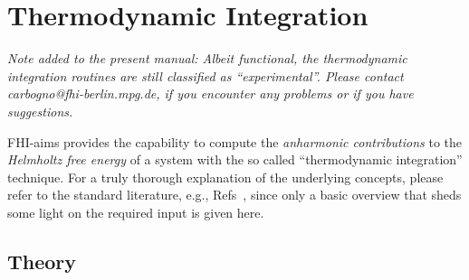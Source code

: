 \section{Thermodynamic Integration}
\label{Sec:TDI}

\emph{Note added to the present manual: Albeit functional, 
the thermodynamic integration routines are still classified 
as ``experimental''. Please contact carbogno@fhi-berlin.mpg.de,
if you encounter any problems or if you have suggestions.}


FHI-aims provides the capability to compute the {\it anharmonic contributions}
to the {\it Helmholtz free energy} of a system with the so called ``thermodynamic
integration'' technique. For a truly thorough explanation of the underlying 
concepts, please refer to the standard literature, e.g., Refs~\cite{Vocadlo02,Grabowski09}, since
only a basic overview that sheds some light on the required input is given here.

\subsection*{Theory}

